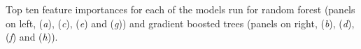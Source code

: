 Top ten feature importances for each of the models run for random forest (panels on left, (\textit{a}), (\textit{c}), (\textit{e}) and (\textit{g})) and gradient boosted trees (panels on right, (\textit{b}), (\textit{d}), (\textit{f}) and (\textit{h})). 
\label{fig:featureimportances}